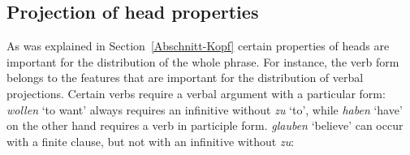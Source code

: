 \subsection{Projection of head properties}
\label{Abschnitt-Kopfeigenschaften}

As was explained in Section~\ref{Abschnitt-Kopf} certain properties of heads are important for the distribution of
the whole phrase. For instance, the verb form belongs to the features that are important for the
distribution of verbal projections. Certain verbs require a verbal argument with a particular form:
\eal
\label{bsp-projektion-v-merkmale}
\zl
\emph{wollen} `to want' always requires an infinitive without \emph{zu} `to', while \emph{haben} `have' on the other hand requires a verb in participle form.
\emph{glauben} `believe' can occur with a finite clause, but not with an infinitive without \emph{zu}:
\eal
{}
\zl

